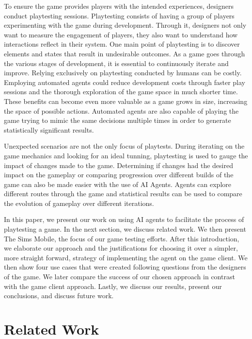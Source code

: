\documentclass[letterpaper]{article} %
\begin{document}
To ensure the game provides players with the intended experiences, designers conduct playtesting sessions. Playtesting consists of having a group of players experimenting with the game during development. Through it, designers not only want to measure the engagement of players, they  also want to understand how interactions reflect in their system. One main point of playtesting is to discover elements and states that result in undesirable outcomes. As a game goes through the various stages of development, it is essential to continuously iterate and improve. Relying exclusively on playtesting conducted by humans can be costly. Employing automated agents could reduce development costs through faster play sessions and the thorough exploration of the game space in much shorter time. These benefits can become even more valuable as a game grows in size, increasing the space of possible actions. Automated agents are also capable of playing the game trying to mimic the same decisions multiple times in order to generate statistically significant results.

Unexpected scenarios are not the only focus of playtests. During iterating on the game mechanics and looking for an ideal tunning, playtesting is used to gauge the impact of changes made to the game. Determining if changes had the desired impact on the gameplay or comparing progression over different builds of the game can also be made easier with the use of AI Agents. Agents can explore different routes through the game and statistical results can be used to compare the evolution of gameplay over different iterations.

In this paper, we present our work on using AI agents to facilitate the process of playtesting a game.  In the next section, we discuss related work. We then present The Sims Mobile, the focus of our game testing efforts. After this introduction, we elaborate our approach and the justifications for choosing it over a simpler, more straight forward, strategy of implementing the agent on the game client. We then show four use cases that were created following questions from the designers of the game. We later compare the success of our chosen approach in contrast with the game client approach. Lastly, we discuss our results, present our conclusions, and discuss future work.







\section{Related Work}
\end{document}
